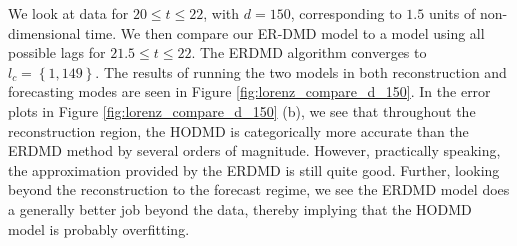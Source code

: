 \documentclass[a4paper,11pt]{article}
\begin{document}
We look at data for $20\leq t \leq 22$, with $d=150$, corresponding to $1.5$ units of non-dimensional time.  We then compare our ER-DMD model to a model using all possible lags for $21.5\leq t \leq 22$.  The ERDMD algorithm converges to $l_{c}=\left\{1,149\right\}$.  The results of running the two models in both reconstruction and forecasting modes are seen in Figure \ref{fig:lorenz_compare_d_150}.  In the error plots in Figure \ref{fig:lorenz_compare_d_150} (b), we see that throughout the reconstruction region, the HODMD is categorically more accurate than the ERDMD method by several orders of magnitude.  However, practically speaking, the approximation provided by the ERDMD is still quite good.  Further, looking beyond the reconstruction to the forecast regime, we see the ERDMD model does a generally better job beyond the data, thereby implying that the HODMD model is probably overfitting.  
\end{document}
